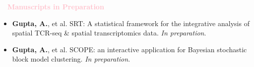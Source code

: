 \documentclass[11pt,a4paper,roman]{moderncv}        %
\begin{document}
\vskip 0.3cm
\textbf{\textcolor{pink}{\large{$\quad$Manuscripts in Preparation}}}
\vskip 0.2cm
\begin{itemize}
\item \textbf{Gupta, A.}, et al. SRT: A statistical framework for the integrative analysis of spatial TCR-seq \& spatial transcriptomics data. \textit{In preparation}.\par\vspace{5pt}
\item \textbf{Gupta, A.}, et al. SCOPE: an interactive application for Bayesian stochastic block model clustering. \textit{In preparation}.
\end{itemize}
\vspace{3pt}

\fussy

\end{document}
